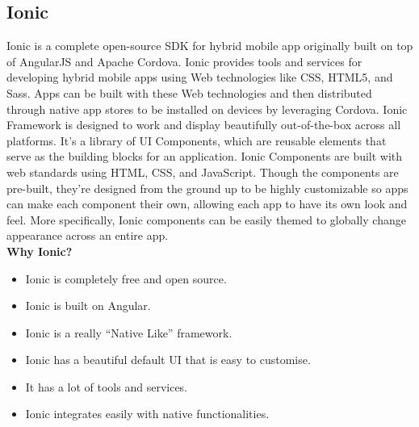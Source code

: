 \subsection{Ionic}
Ionic is a complete open-source SDK for hybrid mobile app originally built on top of AngularJS and Apache Cordova.
Ionic provides tools and services for developing hybrid mobile apps using Web technologies like CSS, HTML5, and Sass. Apps can be built with these Web technologies and then distributed through native app stores to be installed on devices by leveraging Cordova.
Ionic Framework is designed to work and display beautifully out-of-the-box across all platforms. It's a library of UI Components, which are reusable elements that serve as the building blocks for an application. Ionic Components are built with web standards using HTML, CSS, and JavaScript. Though the components are pre-built, they’re designed from the ground up to be highly customizable so apps can make each component their own, allowing each app to have its own look and feel. More specifically, Ionic components can be easily themed to globally change appearance across an entire app.\\

\textbf{Why Ionic?}
\begin{itemize}
\item Ionic is completely free and open source.
\item Ionic is built on Angular.
\item Ionic is a really “Native Like” framework.
\item Ionic has a beautiful default UI that is easy to customise.
\item It has a lot of tools and services.
\item Ionic integrates easily with native functionalities.
\end{itemize}

